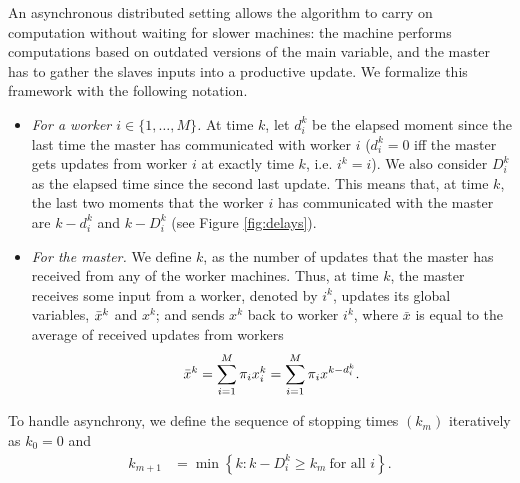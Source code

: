 An asynchronous distributed setting allows the algorithm to carry on computation without waiting for slower machines: the machine performs computations based on outdated versions of the main variable, and the master has to gather the slaves inputs into a productive update. We formalize this framework with the following notation. 
\begin{itemize}
    \item \emph{For a worker $i\in\{1,\ldots,M\}$.} At time $k$, let $d_i^k$ be the elapsed moment since the last time the master has communicated with worker $i$ ($d_i^k = 0$ iff the master gets updates from worker $i$ at exactly time $k$, i.e. $i^k=i$). We also consider  $D_i^k$ as the elapsed time since the second last update. This means that, at time $k$, the last two moments that the worker $i$ has communicated with the master are $k-d_i^k$ and $k-D_i^k$ (see Figure \ref{fig:delays}). 
    \item \emph{For the master.} We define $k$, as the number of updates that the master has received from any of the worker machines. Thus, at time $k$, the master receives some input from a worker, denoted by $i^k$, updates its global variables, $\bar{x}^k$ and $x^k$; and sends $x^k$ back to worker $i^k$, where $\bar{x}$ is equal to the average of received updates from workers
    \begin{equation}\label{eq:barx}
    \bar{x}^k = \sum_{i=1}^M\pi_i x_i^k = \sum_{i=1}^M \pi_i x^{k-d_i^k}.
    \end{equation}
    \end{itemize}
To handle asynchrony, we define the sequence of stopping times $(k_m)$  iteratively as $k_0 = 0$ and
\begin{align}
\label{eq:km}
k_{m+1} &= \min\left\{ k : k- D_i^k \geq k_m ~\text{for all $i$} \right\}.
\end{align}

